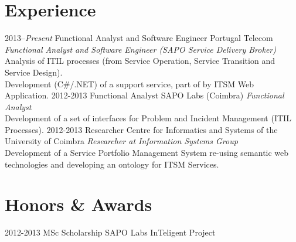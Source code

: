 \documentclass[]{friggeri-cv} %
\begin{document}
\section{Experience}

\begin{entrylist}
\entry
{2013--\emph{Present}}
{Functional Analyst and Software Engineer}
{Portugal Telecom}
{\emph{Functional Analyst and Software Engineer (SAPO Service Delivery Broker)}\\
Analysis of ITIL processes (from Service Operation, Service Transition and Service Design).\\
Development (C\#/.NET) of a support service, part of by ITSM Web Application.}
\entry
{2012-2013}
{Functional Analyst}
{SAPO Labs (Coimbra)}
{\emph{Functional Analyst}\\
Development of a set of interfaces for Problem and Incident Management (ITIL Processes).}
\entry
{2012-2013}
{Researcher}
{Centre for Informatics and Systems of the University of Coimbra}
{\emph{Researcher at Information Systems Group}\\
Development of a Service Portfolio Management System re-using semantic web technologies and developing an ontology for ITSM Services.}

\end{entrylist}


\section{Honors \& Awards}

\begin{entrylist}
\entry
{2012-2013}
{MSc Scholarship}
{SAPO Labs}
{InTeligent Project}
\end{entrylist}

\vfill\eject
\end{document}
